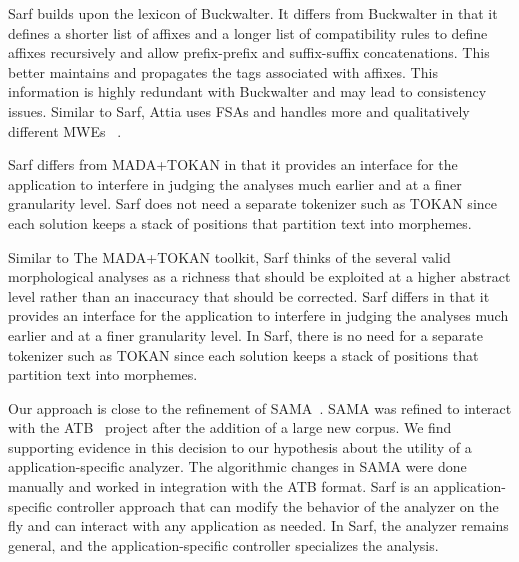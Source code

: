 \documentclass[a4,12pt]{report}
\begin{document}
Sarf builds upon the lexicon of Buckwalter\cite{Buckwalter:02}.
It differs from Buckwalter in that it defines a shorter list of affixes
and a longer list of 
compatibility rules to define 
affixes recursively and allow 
prefix-prefix and suffix-suffix 
concatenations.
This better maintains and propagates 
the tags associated with affixes.  
This information is highly 
redundant with Buckwalter and may lead to consistency issues. 
Similar to Sarf, Attia uses FSAs and handles more and qualitatively different MWEs
~\cite{Attia:06,Attia:10}.

Sarf differs from MADA+TOKAN in that it provides an interface for the 
application to interfere in judging the analyses much earlier and
at a finer granularity level. 
Sarf does not need a separate tokenizer such as
TOKAN since each solution keeps a stack of positions
that partition text into morphemes.

Similar to The MADA+TOKAN toolkit, Sarf thinks of
the several valid morphological analyses as a richness that 
should be exploited at a higher abstract level rather than
an inaccuracy that should be corrected. 
Sarf differs in that it provides an interface for the 
application to interfere in judging the analyses much earlier and
at a finer granularity level. 
In Sarf, there is no need for a separate tokenizer such as
TOKAN since each solution keeps a stack of positions
that partition text into morphemes.


Our approach is close to the refinement of SAMA~\cite{Maamouri:10}.
SAMA was refined to interact with
the ATB~\cite{Maamouri:04} project after the addition of a large 
new corpus. 
We find supporting evidence in this decision to our hypothesis
about the utility of a application-specific analyzer. 
The algorithmic changes in SAMA were
done manually and worked in integration with the ATB format. 
Sarf is an application-specific controller approach that can modify 
the behavior of the analyzer on the fly and can interact
with any application as needed. 
In Sarf, the analyzer remains general, and the 
application-specific controller specializes the analysis.
\end{document}
